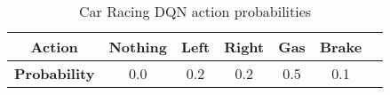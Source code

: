\begin{table}[H]
  \centering
  \begin{tabular}{|c|c|c|c|c|c|c|}
    \hline
    \textbf{Action}      & Nothing & Left & Right & Gas & Brake \\
    \hline
    \textbf{Probability} & 0.0     & 0.2  & 0.2   & 0.5 & 0.1   \\
    \hline
  \end{tabular}
  \caption{Car Racing DQN action probabilities}
  \label{table:car_racing_dqn_probs}
\end{table}
